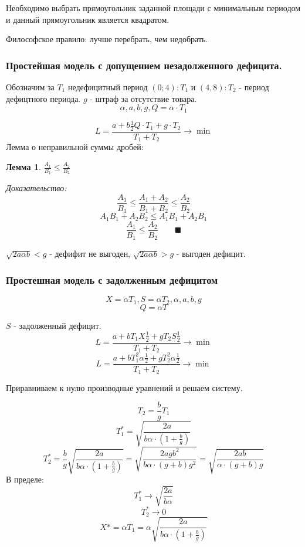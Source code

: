 \documentclass[aps,%
12pt,%
final,%
oneside,
onecolumn,%
musixtex, %
superscriptaddress,%
centertags]{article} %
\theoremstyle{plain}
\newtheorem{lemma}{Лемма}
\begin{document}
Необходимо выбрать прямоугольник заданной площади с минимальным периодом и данный прямоугольник является квадратом.

Философское правило: лучше перебрать, чем недобрать.

\subsubsection{Простейшая модель с допущением незадолженного дефицита.}

\begin{center}
\end{center}

Обозначим за $T_1$ недефицитный период $(0;4): T_1$ и $(4,8):T_2$ - период дефицтного периода. $g$ - штраф за отсутствие товара.
$$\alpha,a,b,g, Q = \alpha \cdot T_1$$

$$L = \frac{a+b\frac{1}{2}Q \cdot T_1+g\cdot T_2}{T_1 + T_2} \to \min$$
Лемма о неправильной суммы дробей:
\begin{lemma}
	$\frac{A_1}{B_1} \leq \frac{A_2}{B_2}$
\end{lemma}
\textit{Доказательство:}
$$\frac{A_1}{B_1} \leq \frac{A_1+A_2}{B_1+B_2} \leq \frac{A_2}{B_2}$$
$$A_1B_1 +A_2B_2 \leq A_1B_1 + A_2B_1 $$
$$\frac{A_1}{B_1} \leq \frac{A_2}{B_2} \qquad \blacksquare$$

$\sqrt{2a\alpha b} < g$ - дефифит не выгоден,
$\sqrt{2a\alpha b} > g$ - выгоден дефицит.

\subsubsection{Простешная модель с задолженным дефицитом}
$$ X = \alpha T_1, S = \alpha T_2, \alpha,a,b,g$$
$$ Q = \alpha T $$

$S $ - задолженный дефицит.
$$L = \frac{a+bT_1X\frac{1}{2} + g T_2 S \frac{1}{2}}{T_1 + T_2} \to \min$$
$$L = \frac{a+bT_1^2\alpha \frac{1}{2} + g T_2^2 \alpha \frac{1}{2}}{T_1 + T_2} \to \min$$

Приравниваем к нулю производные уравнений и решаем систему.

$$T_2 = \frac{b}{g}T_1$$
$$T_1^* = \sqrt{\frac{2a}{b\alpha \cdot (1+\frac{b}{g})}}$$
$$ T_2^* = \frac{b}{g}  \sqrt{\frac{2a}{b\alpha \cdot (1+\frac{b}{g})}} =  \sqrt{\frac{2agb^2}{b\alpha \cdot (g+b) g^2}} =\sqrt{\frac{2ab}{\alpha \cdot (g+b) g}} $$
В пределе:
$$T_1^* \to \sqrt{\frac{2a}{b\alpha }}$$
$$T_2^* \to 0$$
$$X*=\alpha T_1 = \alpha  \sqrt{\frac{2a}{b\alpha \cdot (1+\frac{b}{g})}} $$
\end{document}
